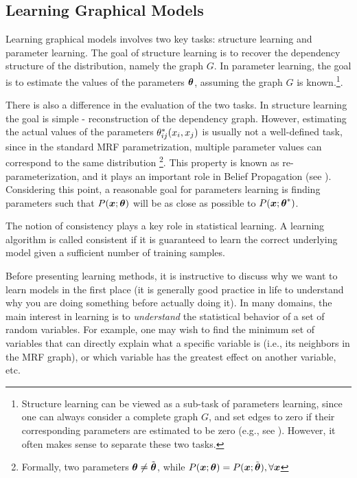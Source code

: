 \subsection{Learning Graphical Models}
\label{sec:learning}
Learning graphical models involves two key tasks: structure learning and parameter learning.
 The goal of structure learning is to recover the dependency structure of the distribution, namely the graph $G$. In parameter learning, the goal is to estimate the values of the parameters $\boldsymbol{\theta}$, assuming the graph $G$ is known.\footnote{Structure learning can be viewed as a sub-task of parameters learning, since one can always consider a complete graph $G$, and set edges to zero if their corresponding parameters
 are estimated to be zero (e.g., see \cite{ravikumar2010high}). However, it often makes sense to separate these two tasks.}.
 
 
There is also a difference in the evaluation of the two tasks.  In structure learning the goal is simple - reconstruction of the dependency graph. However, estimating the actual values of the parameters ${\theta}^{*}_{ij}(x_i,x_j)$ is usually not a well-defined task, since in the standard MRF parametrization, multiple 
parameter values can correspond to the same distribution \footnote{Formally, two parameters $\boldsymbol{\theta} \neq \tilde{\boldsymbol{\theta}}$, while $P(\boldsymbol{x}; \boldsymbol{\theta}) = P(\boldsymbol{x}; \tilde{\boldsymbol{\theta}}), \forall \boldsymbol{x}$}.
This property is known as re-parameterization, and it plays an important role in Belief Propagation (see ). Considering this point, a reasonable goal for parameters learning is finding parameters such that $P(\boldsymbol{x};\boldsymbol{\theta})$ will be as close as possible to $P(\boldsymbol{x};{\boldsymbol{\theta}}^{*})$. 

The notion of consistency plays a key role in statistical learning. A learning algorithm is called consistent if it is guaranteed to learn the correct underlying model given a sufficient number of 
training samples. 

Before presenting learning methods, it is instructive to discuss why we want to learn models in the first place (it is generally good practice in life to understand why you are doing something before actually doing it). 
In many domains, the main interest in learning is to {\em understand} the statistical behavior of a set of random variables.
For example, one may wish to find the minimum set of variables that can directly explain what a specific variable is (i.e., its neighbors in the MRF graph), or which variable has the greatest effect on another variable, etc.

